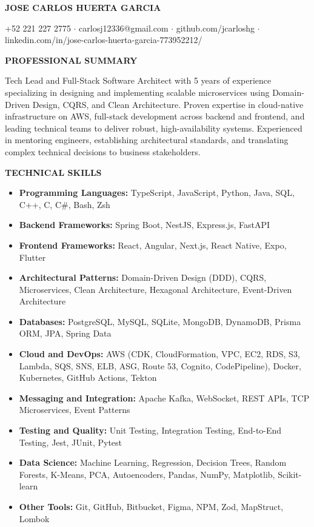 \documentclass[11pt,letterpaper]{article}
\newcommand{\sectiontitle}[1]{
  {\large\textbf{#1}}
  \vspace{3pt}
}
\begin{document}
\centerline{\textbf{\Large JOSE CARLOS HUERTA GARCIA}}
\vspace{2pt}
\centerline{
  +52 221 227 2775 $\cdot$ carlosj12336@gmail.com $\cdot$ github.com/jcarloshg $\cdot$ linkedin.com/in/jose-carlos-huerta-garcia-773952212/
}
\vspace{8pt}

\sectiontitle{PROFESSIONAL SUMMARY}
Tech Lead and Full-Stack Software Architect with 5 years of experience specializing in designing and implementing scalable microservices using Domain-Driven Design, CQRS, and Clean Architecture. Proven expertise in cloud-native infrastructure on AWS, full-stack development across backend and frontend, and leading technical teams to deliver robust, high-availability systems. Experienced in mentoring engineers, establishing architectural standards, and translating complex technical decisions to business stakeholders.
\vspace{8pt}

\sectiontitle{TECHNICAL SKILLS}
\begin{itemize}
  \setlength{\itemsep}{0pt}
  \setlength{\parskip}{0pt}

  \item \textbf{Programming Languages:} TypeScript, JavaScript, Python, Java, SQL, C++, C, C\#, Bash, Zsh

  \item \textbf{Backend Frameworks:} Spring Boot, NestJS, Express.js, FastAPI

  \item \textbf{Frontend Frameworks:} React, Angular, Next.js, React Native, Expo, Flutter

  \item \textbf{Architectural Patterns:} Domain-Driven Design (DDD), CQRS, Microservices, Clean Architecture, Hexagonal Architecture, Event-Driven Architecture

  \item \textbf{Databases:} PostgreSQL, MySQL, SQLite, MongoDB, DynamoDB, Prisma ORM, JPA, Spring Data

  \item \textbf{Cloud and DevOps:} AWS (CDK, CloudFormation, VPC, EC2, RDS, S3, Lambda, SQS, SNS, ELB, ASG, Route 53, Cognito, CodePipeline), Docker, Kubernetes, GitHub Actions, Tekton

  \item \textbf{Messaging and Integration:} Apache Kafka, WebSocket, REST APIs, TCP Microservices, Event Patterns

  \item \textbf{Testing and Quality:} Unit Testing, Integration Testing, End-to-End Testing, Jest, JUnit, Pytest

  \item \textbf{Data Science:} Machine Learning, Regression, Decision Trees, Random Forests, K-Means, PCA, Autoencoders, Pandas, NumPy, Matplotlib, Scikit-learn

  \item \textbf{Other Tools:} Git, GitHub, Bitbucket, Figma, NPM, Zod, MapStruct, Lombok
\end{itemize}
\vspace{8pt}
\end{document}
